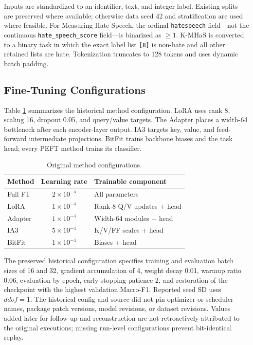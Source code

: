 \documentclass{SPC}
\begin{document}
Inputs are standardized to an identifier, text, and integer label. Existing splits are preserved where available; otherwise data seed 42 and stratification are used where feasible. For Measuring Hate Speech, the ordinal \texttt{hatespeech} field---not the continuous \texttt{hate\_speech\_score} field---is binarized as $\geq1$. K-MHaS is converted to a binary task in which the exact label list \texttt{[8]} is non-hate and all other retained lists are hate. Tokenization truncates to 128 tokens and uses dynamic batch padding.

\subsection{Fine-Tuning Configurations}

Table \ref{tab:methods} summarizes the historical method configuration. LoRA uses rank 8, scaling 16, dropout 0.05, and query/value targets. The Adapter places a width-64 bottleneck after each encoder-layer output. IA3 targets key, value, and feed-forward intermediate projections. BitFit trains backbone biases and the task head; every PEFT method trains its classifier.

\begin{table}[!t]
\caption{Original method configurations.}
\label{tab:methods}
\centering
\small
\setlength{\tabcolsep}{3pt}
\begin{tabular}{lcl}
\toprule
Method & Learning rate & Trainable component \\
\midrule
Full FT & $2\!\times\!10^{-5}$ & All parameters \\
LoRA & $1\!\times\!10^{-4}$ & Rank-8 Q/V updates + head \\
Adapter & $1\!\times\!10^{-4}$ & Width-64 modules + head \\
IA3 & $5\!\times\!10^{-4}$ & K/V/FF scales + head \\
BitFit & $1\!\times\!10^{-4}$ & Biases + head \\
\bottomrule
\end{tabular}
\end{table}

The preserved historical configuration specifies training and evaluation batch sizes of 16 and 32, gradient accumulation of 4, weight decay 0.01, warmup ratio 0.06, evaluation by epoch, early-stopping patience 2, and restoration of the checkpoint with the highest validation Macro-F1. Reported seed SD uses $ddof=1$. The historical config and source did not pin optimizer or scheduler names, package patch versions, model revisions, or dataset revisions. Values added later for follow-up and reconstruction are not retroactively attributed to the original executions; missing run-level configurations prevent bit-identical replay.
\end{document}
